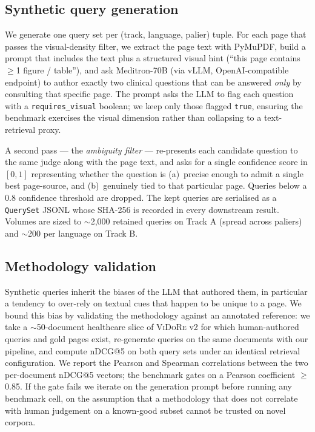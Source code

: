 \documentclass[10pt,a4paper]{article}
\begin{document}
\subsection{Synthetic query generation}

We generate one query set per (track, language, palier) tuple. For each
page that passes the visual-density filter, we extract the page text with
PyMuPDF, build a prompt that includes the text plus a structured visual hint
(``this page contains $\geq$1 figure / table''), and ask Meditron-70B (via
vLLM, OpenAI-compatible endpoint) to author exactly two clinical questions
that can be answered \emph{only} by consulting that specific page. The
prompt asks the LLM to flag each question with a \texttt{requires\_visual}
boolean; we keep only those flagged \texttt{true}, ensuring the benchmark
exercises the visual dimension rather than collapsing to a text-retrieval
proxy.

A second pass --- the \emph{ambiguity filter} --- re-presents each
candidate question to the same judge along with the page text, and asks for
a single confidence score in $[0, 1]$ representing whether the question is
(a)~precise enough to admit a single best page-source, and (b)~genuinely
tied to that particular page. Queries below a 0.8 confidence threshold are
dropped. The kept queries are serialised as a \texttt{QuerySet} JSONL whose
SHA-256 is recorded in every downstream result. Volumes are sized to
$\sim$2{,}000 retained queries on Track A (spread across paliers) and
$\sim$200 per language on Track B.

\subsection{Methodology validation}
\label{sec:methodology-validation}

Synthetic queries inherit the biases of the LLM that authored them, in
particular a tendency to over-rely on textual cues that happen to be unique
to a page. We bound this bias by validating the methodology against an
annotated reference: we take a $\sim$50-document healthcare slice of
\textsc{ViDoRe} v2 for which human-authored queries and gold pages exist,
re-generate queries on the same documents with our pipeline, and compute
nDCG@5 on both query sets under an identical retrieval configuration. We
report the Pearson and Spearman correlations between the two per-document
nDCG@5 vectors; the benchmark gates on a Pearson coefficient
$\geq$ 0.85. If the gate fails we iterate on the generation prompt before
running any benchmark cell, on the assumption that a methodology that does
not correlate with human judgement on a known-good subset cannot be trusted
on novel corpora.
\end{document}
